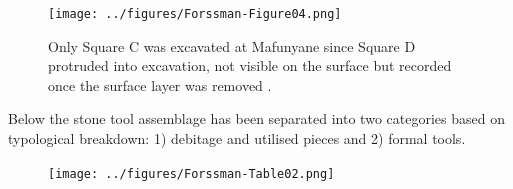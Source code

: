 	\begin{figure} %
		\texttt{[image: ../figures/Forssman-Figure04.png]}
		\caption{Only Square C was excavated at Mafunyane since Square D protruded into \textcite['s]{Walker_1994} excavation, not visible on the surface but recorded once the surface layer was removed \parencite[from][96]{Forssman_2014a}.}
		\label{fig:Forsmann-Figure04}
	\end{figure}

Below the stone tool assemblage has been separated into two categories based on \textcite['s]{Walker_1994} typological breakdown: 1) debitage and utilised pieces and 2) formal tools.

	\begin{figure} %
		\texttt{[image: ../figures/Forssman-Table02.png]}
		\label{fig:Forssman-Table02}
	\end{figure}

	
	\printbibliography[heading=subbibnumbered] 
	\label{Forssman:lastpage}
\closingarticle